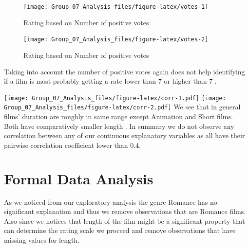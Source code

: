 \documentclass[
]{article}
\begin{document}
\begin{figure}[H]

{\centering \texttt{[image: Group\_07\_Analysis\_files/figure-latex/votes-1]} 

}

\caption{\label{fig:votes} Rating based on Number of positive votes}\label{fig:votes-1}
\end{figure}
\begin{figure}[H]

{\centering \texttt{[image: Group\_07\_Analysis\_files/figure-latex/votes-2]} 

}

\caption{\label{fig:votes} Rating based on Number of positive votes}\label{fig:votes-2}
\end{figure}

Taking into account the number of positive votes again does not help
identifying if a film is most probably getting a rate lower than 7 or
higher than 7 .

\texttt{[image: Group\_07\_Analysis\_files/figure-latex/corr-1.pdf]}
\texttt{[image: Group\_07\_Analysis\_files/figure-latex/corr-2.pdf]} We see
that in general films' duration are roughly in same range except
Animation and Short films. Both have comparatively smaller length . In
summary we do not observe any correlation between any of our continuous
explanatory variables as all have their pairwise correlation coefficient
lower than 0.4.

\hypertarget{sec:FDA}{%
\section{Formal Data Analysis}\label{sec:FDA}}

As we noticed from our exploratory analysis the genre Romance has no
significant explanation and thus we remove observations that are Romance
films. Also since we notices that length of the film might be a
significant property that can determine the rating scale we proceed and
remove observations that have missing values for length.
\end{document}

